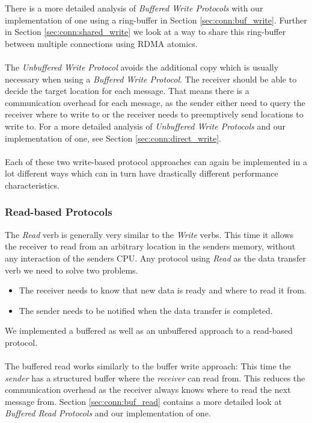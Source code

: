 There is a more detailed analysis of \emph{Buffered Write Protocols} with our implementation of one using a ring-buffer in 
Section \ref{sec:conn:buf_write}. Further in Section \ref{sec:conn:shared_write} we look at a way to share this ring-buffer between multiple connections using RDMA atomics.


\paragraph{} The  \emph{Unbuffered Write Protocol} avoids the additional copy which is usually necessary when 
using a \emph{Buffered Write Protocol}. The receiver should be able to decide the target location for each message. 
That means there is a communication overhead for each message, as the sender either need to query the receiver where to 
write to or the receiver needs to preemptively send locations to write to.
For a more detailed analysis of \emph{Unbuffered Write Protocols} and our implementation of one, 
see Section \ref{sec:conn:direct_write}.


\paragraph{}Each of these two write-based protocol approaches can again be implemented in a lot different ways which can
in turn have drastically different performance characteristics. 


\subsubsection{Read-based Protocols}
The \emph{Read} verb is generally very similar to the \emph{Write} verbs. This time it allows the receiver to read from 
an arbitrary location in the senders memory, without any interaction of the senders CPU. Any protocol
using \emph{Read} as the data transfer verb we need to solve two problems.

\begin{itemize}
  \item The receiver needs to know that new data is ready and where to read it from.
  \item The sender needs to be notified when the data transfer is completed.
\end{itemize}

We implemented a buffered as well as an unbuffered approach to a read-based protocol. 


\paragraph{} The buffered read works similarly to the buffer write approach: This time the \emph{sender} has a structured buffer where the 
\emph{receiver} can read from. This reduces the communication overhead as the receiver always knows where to read the next 
message from. Section \ref{sec:conn:buf_read} contains a more detailed look at \emph{Buffered Read Protocols} and our 
implementation of one.

